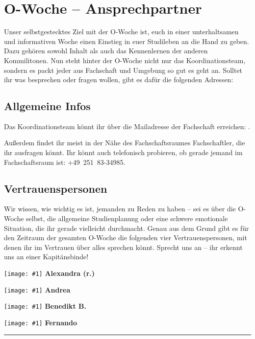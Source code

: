 \newcommand{\fibelvp}[2]{
	\minipage{0.24\textwidth}
		\begin{centering}
			\texttt{[image: \#1]}
			\textbf{#2}
		\end{centering}
	\endminipage\hfill
}

\section{O-Woche -- Ansprechpartner}

Unser selbstgestecktes Ziel mit der O-Woche ist, euch in einer unterhaltsamen und informativen Woche einen
Einstieg in euer Studileben an die Hand zu geben. Dazu gehören sowohl Inhalt als auch das Kennenlernen der
anderen Kommilitonen. Nun steht hinter der O-Woche nicht nur das Koordinationsteam, sondern es packt jeder
aus Fachschaft und Umgebung so gut es geht an. Solltet ihr was besprechen oder fragen wollen, gibt es dafür die
folgenden Adressen:

\subsection{Allgemeine Infos}
Das Koordinationsteam könnt ihr über die Mailadresse der Fachschaft erreichen: .

Außerdem findet ihr meist in der Nähe des Fachschaftsraumes Fachschaftler, die ihr ausfragen könnt. Ihr könnt
auch telefonisch probieren, ob gerade jemand im Fachschaftsraum ist: +49~251~83-34985.

\subsection{Vertrauenspersonen}
Wir wissen, wie wichtig es ist, jemanden zu Reden zu haben -- sei es über die O-Woche selbst, die
allgemeine Studienplanung oder eine schwere emotionale Situation, die ihr gerade vielleicht durchmacht. Genau aus dem Grund
gibt es für den Zeitraum der gesamten O-Woche die folgenden vier Vertrauenspersonen, mit denen ihr im Vertrauen über
alles sprechen könnt. Sprecht uns an -- ihr erkennt uns an einer Kapitänsbinde!

\fibelvp{res/vorstellungsfotos/simon_may_alexandra_everwand_edited_cropped.jpg}{Alexandra (r.)}
\fibelvp{res/vorstellungsfotos/andrea_garner_cropped.JPG}{Andrea}
\fibelvp{res/vorstellungsfotos/benedikt_bieringer.png}{Benedikt B.}
\fibelvp{res/vorstellungsfotos/fernando_romahn.png}{Fernando}

\rule{2cm}{0.4pt}

\fibelnotesimgsmall
